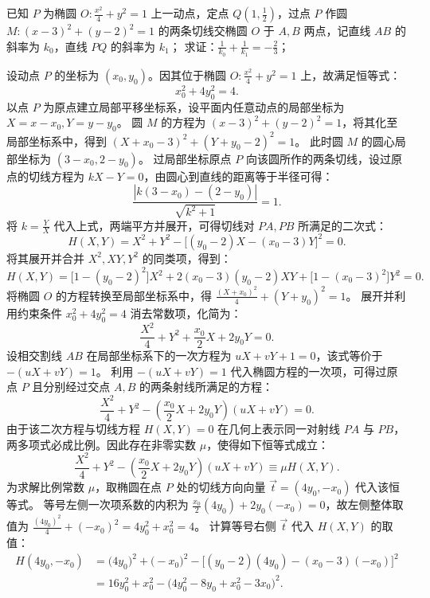 \begin{exercise}
已知 \(P\) 为椭圆 \(O: \frac{x^2}{4} + y^2 = 1\) 上一动点，定点 \(Q\left(1, \frac{1}{2}\right)\)，过点 \(P\) 作圆 \(M: (x - 3)^2 + (y - 2)^2 = 1\) 的两条切线交椭圆 \(O\) 于 \(A,B\) 两点，记直线 \(AB\) 的斜率为 \(k_0\)，直线 \(PQ\) 的斜率为 \(k_1\)；
求证：\(\frac{1}{k_0} + \frac{1}{k_1} = -\frac{2}{3}\)；
\end{exercise}
\begin{solution}
设动点 $P$ 的坐标为 $(x_0, y_0)$。因其位于椭圆 $O: \frac{x^2}{4} + y^2 = 1$ 上，故满足恒等式：
\[ x_0^2 + 4y_0^2 = 4. \]
以点 $P$ 为原点建立局部平移坐标系，设平面内任意动点的局部坐标为 $X = x - x_0, Y = y - y_0$。
圆 $M$ 的方程为 $(x - 3)^2 + (y - 2)^2 = 1$，将其化至局部坐标系中，得到 $(X + x_0 - 3)^2 + (Y + y_0 - 2)^2 = 1$。
此时圆 $M$ 的圆心局部坐标为 $(3 - x_0, 2 - y_0)$。
过局部坐标原点 $P$ 向该圆所作的两条切线，设过原点的切线方程为 $kX - Y = 0$，由圆心到直线的距离等于半径可得：
\[ \frac{|k(3 - x_0) - (2 - y_0)|}{\sqrt{k^2 + 1}} = 1. \]
将 $k = \frac{Y}{X}$ 代入上式，两端平方并展开，可得切线对 $PA, PB$ 所满足的二次式：
\[ H(X,Y) = X^2 + Y^2 - \big[ (y_0 - 2)X - (x_0 - 3)Y \big]^2 = 0. \]
将其展开并合并 $X^2, XY, Y^2$ 的同类项，得到：
\[ H(X,Y) = \big[ 1 - (y_0 - 2)^2 \big]X^2 + 2(x_0 - 3)(y_0 - 2)XY + \big[ 1 - (x_0 - 3)^2 \big]Y^2 = 0. \]
将椭圆 $O$ 的方程转换至局部坐标系中，得 $\frac{(X + x_0)^2}{4} + (Y + y_0)^2 = 1$。
展开并利用约束条件 $x_0^2 + 4y_0^2 = 4$ 消去常数项，化简为：
\[ \frac{X^2}{4} + Y^2 + \frac{x_0}{2}X + 2y_0 Y = 0. \]
设相交割线 $AB$ 在局部坐标系下的一次方程为 $uX + vY + 1 = 0$，该式等价于 $-(uX + vY) = 1$。
利用 $-(uX + vY) = 1$ 代入椭圆方程的一次项，可得过原点 $P$ 且分别经过交点 $A, B$ 的两条射线所满足的方程：
\[ \frac{X^2}{4} + Y^2 - \left( \frac{x_0}{2}X + 2y_0 Y \right)(uX + vY) = 0. \]
由于该二次方程与切线方程 $H(X,Y) = 0$ 在几何上表示同一对射线 $PA$ 与 $PB$，两多项式必成比例。因此存在非零实数 $\mu$，使得如下恒等式成立：
\[ \frac{X^2}{4} + Y^2 - \left( \frac{x_0}{2}X + 2y_0 Y \right)(uX + vY) \equiv \mu H(X,Y). \]
为求解比例常数 $\mu$，取椭圆在点 $P$ 处的切线方向向量 $\vec{t} = (4y_0, -x_0)$ 代入该恒等式。
等号左侧一次项系数的内积为 $\frac{x_0}{2}(4y_0) + 2y_0(-x_0) = 0$，故左侧整体取值为 $\frac{(4y_0)^2}{4} + (-x_0)^2 = 4y_0^2 + x_0^2 = 4$。
计算等号右侧 $\vec{t}$ 代入 $H(X,Y)$ 的取值：
\begin{align*}
H(4y_0, -x_0) &= \big( 4y_0 \big)^2 + \big( -x_0 \big)^2 - \big[ (y_0 - 2)(4y_0) - (x_0 - 3)(-x_0) \big]^2 \\
&= 16y_0^2 + x_0^2 - \big( 4y_0^2 - 8y_0 + x_0^2 - 3x_0 \big)^2.
\end{align*}

\end{solution}
